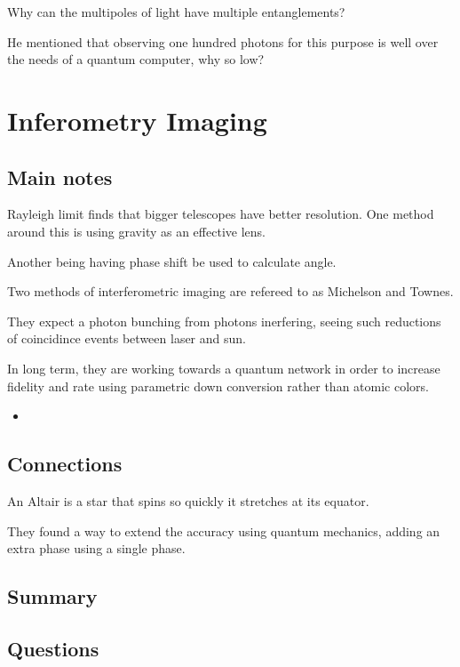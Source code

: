 Why can the multipoles of light have multiple entanglements?

He mentioned that observing one hundred photons for this purpose is well over the needs of a quantum computer, why so low?


\section{Inferometry Imaging}
\subsection{Main notes}
Rayleigh limit finds that bigger telescopes have better resolution. One method around this is using gravity as an effective lens.

Another being having phase shift be used to calculate angle.

Two methods of interferometric imaging are refereed to as Michelson and Townes.

They expect a photon bunching from photons inerfering, seeing such reductions of coincidince events between laser and sun.

In long term, they are working towards a quantum network in order to increase fidelity and rate using parametric down conversion rather than atomic colors.

\begin{itemize}
	\item
\end{itemize}


\subsection{Connections}
An Altair is a star that spins so quickly it stretches at its equator.

They found a way to extend the accuracy using quantum mechanics, adding an extra phase using a single phase.
\subsection{Summary}


\subsection{Questions}
